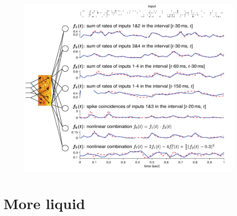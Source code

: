 \begin{frame}[allowframebreaks]
	\begin{figure}
		\centering
		\includegraphics[width=0.7\linewidth]{images/projectionNeurons}
		\caption{}
		\label{fig:projectionneurons}
	\end{figure}

\end{frame}

\section{More liquid}

